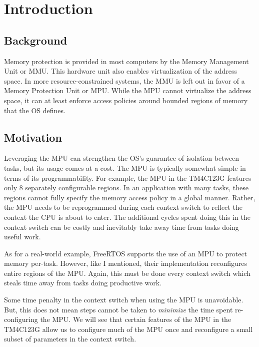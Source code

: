 
\chapter{Introduction}

\section{Background}

Memory protection is provided in most computers by the Memory Management Unit or MMU. This hardware unit also enables virtualization of the address space. In more resource-constrained systems, the MMU is left out in favor of a Memory Protection Unit or MPU. While the MPU cannot virtualize the address space, it can at least enforce access policies around bounded regions of memory that the OS defines.

\section{Motivation}


Leveraging the MPU can strengthen the OS's guarantee of isolation between tasks, but its usage comes at a cost. The MPU is typically somewhat simple in terms of its programmability. For example, the MPU in the TM4C123G features only 8 separately configurable regions. In an application with many tasks, these regions cannot fully specify the memory access policy in a global manner. Rather, the MPU needs to be reprogrammed during each context switch to reflect the context the CPU is about to enter. The additional cycles spent doing this in the context switch can be costly and inevitably take away time from tasks doing useful work.

As for a real-world example, FreeRTOS supports the use of an MPU to protect memory per-task\footnotemark. However, like I mentioned, their implementation reconfigures entire regions of the MPU. Again, this must be done every context switch which steals time away from tasks doing productive work.


Some time penalty in the context switch when using the MPU is unavoidable. But, this does not mean steps cannot be taken to \textit{minimize} the time spent re-configuring the MPU. We will see that certain features of the MPU in the TM4C123G allow us to configure much of the MPU once and reconfigure a small subset of parameters in the context switch.


